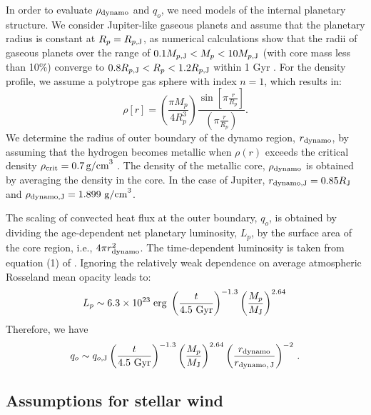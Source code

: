 \documentclass[iop,numberedappendix,apj]{emulateapj}
\begin{document}
In order to evaluate $\rho _{\rm dynamo}$ and $q_o$, we need models of the internal planetary structure. 
We consider Jupiter-like gaseous planets and assume that the planetary radius is constant at $R_p = R_{p,{\rm J}}$, as numerical calculations show that the radii of gaseous planets over the range of $0.1 M_{p,{\rm J}} < M_p < 10M_{p, {\rm J}}$ (with core mass less than 10\%) converge to $0.8 R_{p,{\rm J}} < R_p < 1.2R_{p, {\rm J}}$ within 1 Gyr \citep{fortney2007}. 
For the density profile, we assume a polytrope gas sphere with index $n=1$, which results in:
\begin{equation}
\rho [r] = \left( \frac{\pi M_p}{4 R_p^3} \right) \frac{\sin \left[ \pi \frac{r}{R_p} \right]}{\left( \pi \frac{r}{R_p} \right)}. \label{eq:rho_r}
\end{equation}
We determine the radius of outer boundary of the dynamo region, $r_{\rm dynamo}$, by assuming that the hydrogen becomes metallic when $\rho (r)$ exceeds the critical density $\rho_{\rm crit}=0.7\,\mbox{g/cm}^3$ \citep{exoplanets2006, griesmeier2007b}.
The density of the metallic core, $\rho _{\rm dynamo}$ is obtained by averaging the density in the core. 
In the case of Jupiter, $r_{\rm dynamo, J} = 0.85 R_{\rm J}$ and $\rho_{\rm dynamo, J} = 1.899~{\rm g/cm}^3$.

The scaling of convected heat flux at the outer boundary, $q_o$, is obtained by dividing the age-dependent net planetary luminosity, $L_p$, by the surface area of the core region, i.e., $4\pi r_{\rm dynamo}^2$. 
The time-dependent luminosity is taken from equation (1) of \citet{burrows_et_al2001} \citep[see also][]{marley2007}. 
Ignoring the relatively weak dependence on average atmospheric Rosseland mean opacity leads to:
\begin{equation}	
L_p \sim 6.3\times10^{23} \; {\rm erg} \; \left( \frac{t}{4.5 \rm~Gyr} \right)^{-1.3} \left( \frac{M_p}{M_{\rm J}} \right)^{2.64} \, 
\label{eq:burrowsLum}
\end{equation}
Therefore, we have
\begin{equation}
q_o \sim q_{o, {\rm J}} \left( \frac{t}{4.5 \rm~Gyr} \right)^{-1.3} \left( \frac{M_p}{M_{\rm J}} \right)^{2.64} \left( \frac{r_{\rm dynamo}}{r_{\rm dynamo,\,J}} \right)^{-2}\, .
\label{eq:burrowsHeatFlux}
\end{equation}



\subsection{Assumptions for stellar wind}
\label{ss:stellarwind}
\end{document}

